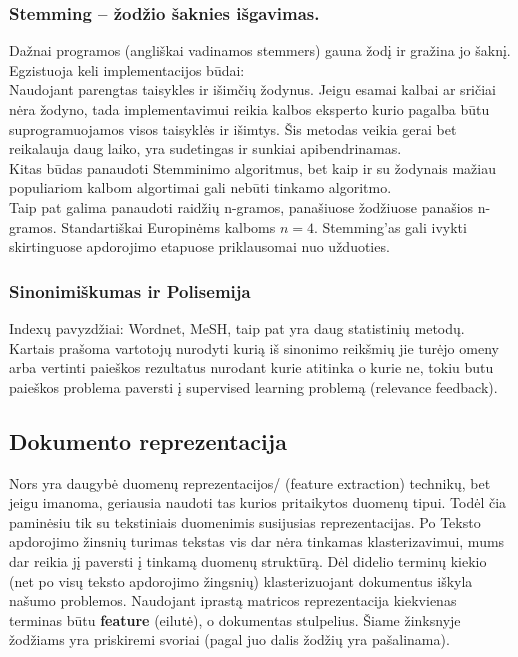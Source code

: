\documentclass{VUMIFInfKursinis}
\begin{document}
\subsubsection{Stemming – žodžio šaknies išgavimas.}
Dažnai programos (angliškai vadinamos stemmers) gauna žodį ir gražina jo šaknį. Egzistuoja keli implementacijos būdai: \\
Naudojant parengtas taisykles ir išimčių žodynus. Jeigu esamai kalbai ar sričiai nėra žodyno, tada implementavimui reikia kalbos eksperto kurio pagalba būtu suprogramuojamos visos taisyklės ir išimtys. Šis metodas veikia gerai bet reikalauja daug laiko, yra sudetingas ir sunkiai apibendrinamas.
\\Kitas būdas panaudoti Stemminimo algoritmus, bet kaip ir su žodynais mažiau populiariom kalbom algortimai gali nebūti tinkamo algoritmo. 
\\Taip pat galima panaudoti raidžių n-gramos, panašiuose žodžiuose panašios n-gramos. Standartiškai Europinėms kalboms $n = 4$. Stemming’as gali ivykti skirtinguose apdorojimo etapuose priklausomai nuo užduoties.

\subsubsection{Sinonimiškumas ir Polisemija}
Indexų pavyzdžiai: Wordnet, MeSH, taip pat yra daug statistinių metodų. Kartais prašoma vartotojų nurodyti kurią iš sinonimo reikšmių jie turėjo omeny arba vertinti paieškos rezultatus nurodant kurie atitinka o kurie ne, tokiu butu paieškos problema paversti į supervised learning problemą (relevance feedback).

\subsection{Dokumento reprezentacija}
Nors yra daugybė duomenų reprezentacijos/ (feature extraction) technikų, bet jeigu imanoma, geriausia naudoti tas kurios pritaikytos duomenų tipui\cite{alelyani2013feature}. Todėl čia paminėsiu tik su tekstiniais duomenimis susijusias reprezentacijas.
Po Teksto apdorojimo žinsnių turimas tekstas vis dar nėra tinkamas klasterizavimui, mums dar reikia jį paversti į tinkamą duomenų struktūrą. Dėl didelio terminų kiekio (net po visų teksto apdorojimo žingsnių) klasterizuojant dokumentus iškyla našumo problemos. Naudojant iprastą matricos reprezentacija kiekvienas terminas būtu \textbf{feature} (eilutė), o dokumentas stulpelius. Šiame žinksnyje žodžiams yra priskiremi svoriai (pagal juo dalis žodžių yra pašalinama).
\end{document}
